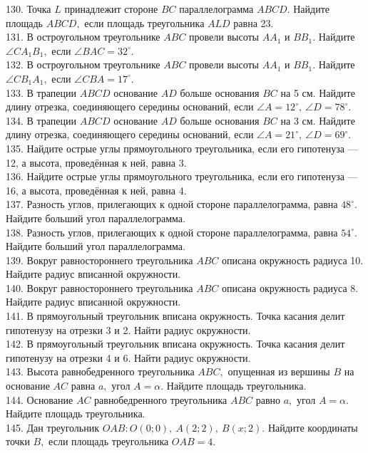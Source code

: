 130. Точка $L$ принадлежит стороне $BC$ параллелограмма $ABCD.$ Найдите площадь $ABCD,$ если площадь треугольника $ALD$ равна 23.\\
131. В остроугольном треугольнике $ABC$ провели высоты $AA_1$ и $BB_1.$ Найдите $\angle CA_1B_1,$ если $\angle BAC=32^\circ.$\\
132. В остроугольном треугольнике $ABC$ провели высоты $AA_1$ и $BB_1.$ Найдите $\angle CB_1A_1,$ если $\angle CBA=17^\circ.$\\
133. В трапеции $ABCD$ основание $AD$ больше основания $BC$ на 5 см. Найдите длину отрезка, соединяющего середины оснований, если $\angle A=12^\circ,\ \angle D=78^\circ.$\\
134. В трапеции $ABCD$ основание $AD$ больше основания $BC$ на 3 см. Найдите длину отрезка, соединяющего середины оснований, если $\angle A=21^\circ,\ \angle D=69^\circ.$\\
135. Найдите острые углы прямоугольного треугольника, если его гипотенуза --- 12, а высота, проведённая к ней, равна 3.\\
136. Найдите острые углы прямоугольного треугольника, если его гипотенуза --- 16, а высота, проведённая к ней, равна 4.\\
137. Разность углов, прилегающих к одной стороне параллелограмма, равна $48^\circ.$ Найдите больший угол параллелограмма.\\
138. Разность углов, прилегающих к одной стороне параллелограмма, равна $54^\circ.$ Найдите больший угол параллелограмма.\\
139. Вокруг равностороннего треугольника $ABC$ описана окружность радиуса 10. Найдите радиус вписанной окружности.\\
140. Вокруг равностороннего треугольника $ABC$ описана окружность радиуса 8. Найдите радиус вписанной окружности.\\
141. В прямоугольный треугольник вписана окружность. Точка касания делит гипотенузу на отрезки 3 и 2. Найти радиус окружности.\\
142. В прямоугольный треугольник вписана окружность. Точка касания делит гипотенузу на отрезки 4 и 6. Найти радиус окружности.\\
143. Высота равнобедренного треугольника $ABC,$ опущенная из вершины $B$ на основание $AC$ равна $a,$ угол $A=\alpha.$ Найдите площадь треугольника.\\
144. Основание $AC$ равнобедренного треугольника $ABC$ равно $a,$ угол $A=\alpha.$ Найдите площадь треугольника.\\
145. Дан треугольник $OAB: O(0;0),\ A(2;2),\ B(x;2).$ Найдите координаты точки $B,$ если площадь треугольника $OAB=4.$\\
